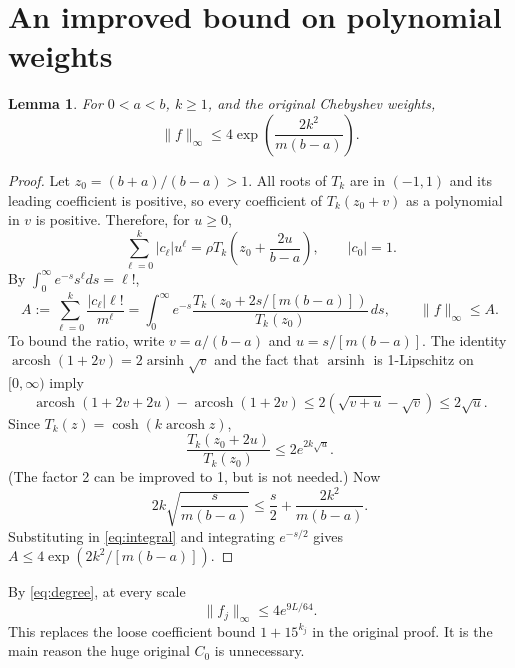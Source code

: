 \documentclass[11pt]{article}
\newtheorem{lemma}{Lemma}
\begin{document}
\section{An improved bound on polynomial weights}
\begin{lemma}
For $0<a<b$, $k\ge1$, and the original Chebyshev weights,
\[
 \|f\|_\infty\le4\exp\!\left(\frac{2k^2}{m(b-a)}\right).
\]
\end{lemma}
\begin{proof}
Let $z_0=(b+a)/(b-a)>1$. All roots of $T_k$ are in $(-1,1)$ and its
leading coefficient is positive, so every coefficient of $T_k(z_0+v)$
as a polynomial in $v$ is positive. Therefore, for $u\ge0$,
\[
 \sum_{\ell=0}^k|c_\ell|u^\ell
 =\rho T_k\!\left(z_0+\frac{2u}{b-a}\right),\qquad |c_0|=1.
\]
By $\int_0^\infty e^{-s}s^\ell ds=\ell!$,
\begin{equation}
 A:=\sum_{\ell=0}^k\frac{|c_\ell|\ell!}{m^\ell}
 =\int_0^\infty e^{-s}
   \frac{T_k(z_0+2s/[m(b-a)])}{T_k(z_0)}\,ds,
 \qquad \|f\|_\infty\le A.\label{eq:integral}
\end{equation}
To bound the ratio, write $v=a/(b-a)$ and $u=s/[m(b-a)]$.
The identity $\operatorname{arcosh}(1+2v)=2\operatorname{arsinh}\sqrt v$
and the fact that $\operatorname{arsinh}$ is 1-Lipschitz on $[0,\infty)$
imply
\[
 \operatorname{arcosh}(1+2v+2u)-\operatorname{arcosh}(1+2v)
 \le2(\sqrt{v+u}-\sqrt v)\le2\sqrt u.
\]
Since $T_k(z)=\cosh(k\operatorname{arcosh}z)$,
\[
 \frac{T_k(z_0+2u)}{T_k(z_0)}\le2e^{2k\sqrt u}.
\]
(The factor 2 can be improved to 1, but is not needed.) Now
\[
 2k\sqrt{\frac{s}{m(b-a)}}\le\frac s2+\frac{2k^2}{m(b-a)}.
\]
Substituting in \eqref{eq:integral} and integrating $e^{-s/2}$ gives
$A\le4\exp(2k^2/[m(b-a)])$.
\end{proof}

By \eqref{eq:degree}, at every scale
\begin{equation}
 \|f_j\|_\infty\le4e^{9L/64}.\label{eq:weights}
\end{equation}
This replaces the loose coefficient bound $1+15^{k_j}$ in the original
proof. It is the main reason the huge original $C_0$ is unnecessary.
\end{document}
